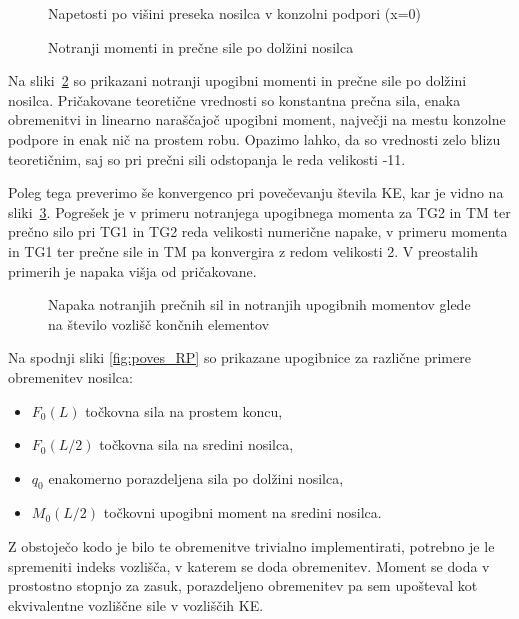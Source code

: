 \begin{figure}[ht]
    \centering
    \caption{Napetosti po višini preseka nosilca v konzolni podpori (x=0)}
    \label{fig:napetosti_presek}
\end{figure}

\begin{figure}[ht]
    \centering
    \caption{Notranji momenti in prečne sile po dolžini nosilca}
    \label{fig:MT}
\end{figure}

Na sliki~\ref{fig:MT} so prikazani notranji upogibni momenti in prečne sile po dolžini nosilca. Pričakovane teoretične vrednosti so konstantna prečna sila, enaka obremenitvi in linearno naraščajoč upogibni moment, največji na mestu konzolne podpore in enak nič na prostem robu. Opazimo lahko, da so vrednosti zelo blizu teoretičnim, saj so pri prečni sili odstopanja le reda velikosti -11.

Poleg tega preverimo še konvergenco pri povečevanju števila KE, kar je vidno na sliki~\ref{fig:napaka_momenti}. Pogrešek je v primeru notranjega upogibnega momenta za TG2 in TM ter prečno silo pri TG1 in TG2 reda velikosti numerične napake, v primeru momenta in TG1 ter prečne sile in TM pa konvergira z redom velikosti 2. V preostalih primerih je napaka višja od pričakovane.

\begin{figure}[ht]
    \centering
    \caption{Napaka notranjih prečnih sil in notranjih upogibnih momentov glede na število vozlišč končnih elementov}
    \label{fig:napaka_momenti}
\end{figure}

\FloatBarrier
Na spodnji sliki \ref{fig:poves_RP} so prikazane upogibnice za različne primere obremenitev nosilca: 
\begin{itemize}
    \item $F_0(L)$ točkovna sila na prostem koncu,
    \item $F_0(L/2)$ točkovna sila na sredini nosilca,
    \item $q_0$ enakomerno porazdeljena sila po dolžini nosilca,
    \item $M_0(L/2)$ točkovni upogibni moment na sredini nosilca.
\end{itemize}
Z obstoječo kodo je bilo te obremenitve trivialno implementirati, potrebno je le spremeniti indeks vozlišča, v katerem se doda obremenitev. Moment se doda v prostostno stopnjo za zasuk, porazdeljeno obremenitev pa sem upošteval kot ekvivalentne vozliščne sile v vozliščih KE.

